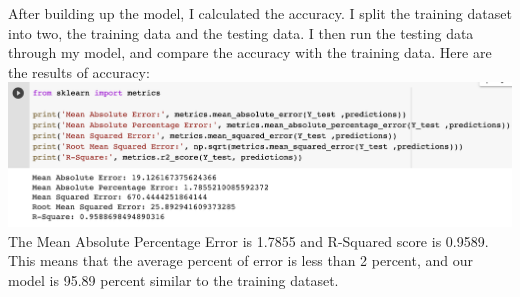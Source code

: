 \documentclass{article}
\begin{document}
After building up the model, I calculated the accuracy. I split the training dataset into two, the training data and the testing data. I then run the testing data through my model, and compare the accuracy with the training data. Here are the results of accuracy:\\
\includegraphics[width=\textwidth]{images/accuracy.png}\\

The Mean Absolute Percentage Error is 1.7855 and R-Squared score is 0.9589. This means that the average percent of error is less than 2 percent, and our model is 95.89 percent similar to the training dataset.
\end{document}
